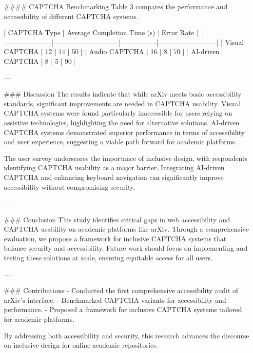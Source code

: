 #### CAPTCHA Benchmarking
Table 3 compares the performance and accessibility of different CAPTCHA systems.

| CAPTCHA Type        | Average Completion Time (s) | Error Rate (%
|---------------------|-----------------------------|----------------|--------------------------|
| Visual CAPTCHA      | 12                          | 14             | 50                       |
| Audio CAPTCHA       | 16                          | 8              | 70                       |
| AI-driven CAPTCHA   | 8                           | 5              | 90                       |

---

### Discussion
The results indicate that while arXiv meets basic accessibility standards, significant improvements are needed in CAPTCHA usability. Visual CAPTCHA systems were found particularly inaccessible for users relying on assistive technologies, highlighting the need for alternative solutions. AI-driven CAPTCHA systems demonstrated superior performance in terms of accessibility and user experience, suggesting a viable path forward for academic platforms.

The user survey underscores the importance of inclusive design, with respondents identifying CAPTCHA usability as a major barrier. Integrating AI-driven CAPTCHA and enhancing keyboard navigation can significantly improve accessibility without compromising security.

---

### Conclusion
This study identifies critical gaps in web accessibility and CAPTCHA usability on academic platforms like arXiv. Through a comprehensive evaluation, we propose a framework for inclusive CAPTCHA systems that balance security and accessibility. Future work should focus on implementing and testing these solutions at scale, ensuring equitable access for all users.

---

### Contributions
- Conducted the first comprehensive accessibility audit of arXiv's interface.
- Benchmarked CAPTCHA variants for accessibility and performance.
- Proposed a framework for inclusive CAPTCHA systems tailored for academic platforms.

By addressing both accessibility and security, this research advances the discourse on inclusive design for online academic repositories.